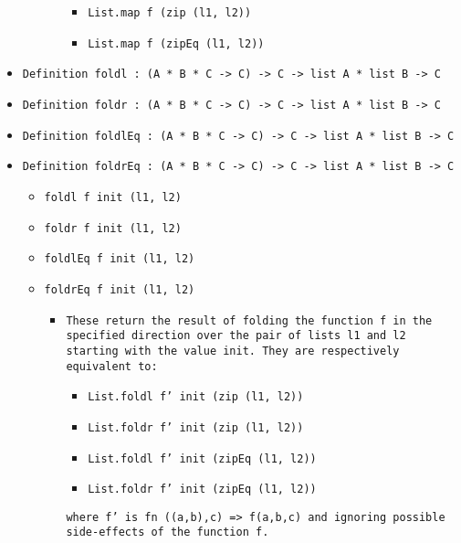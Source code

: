 \documentclass[11pt]{report}
\begin{document}
\begin{itemize}
\begin{itemize}
\begin{itemize}
\begin{itemize}
\item  \texttt{List.map f (zip (l1, l2))}
\item  \texttt{List.map f (zipEq (l1, l2))}
\end{itemize}

\end{itemize}

\end{itemize}

\item  \texttt{Definition foldl : (A * B * C -> C) -> C -> list A * list B -> C}

\item  \texttt{Definition foldr : (A * B * C -> C) -> C -> list A * list B -> C}

\item  \texttt{Definition foldlEq : (A * B * C -> C) -> C -> list A * list B -> C}

\item  \texttt{Definition foldrEq : (A * B * C -> C) -> C -> list A * list B -> C}

\begin{itemize}
\item \texttt{foldl f init (l1, l2)} 
\item \texttt{foldr f init (l1, l2)} 
\item \texttt{foldlEq f init (l1, l2)} 
\item \texttt{foldrEq f init (l1, l2)} 

\begin{itemize} 
\item  \begin{flushleft} \texttt{These return the result of folding the function f in the specified direction over the pair of lists l1 and l2 starting with the value init. They are respectively equivalent to:} \end{flushleft}

\begin{itemize}
\item  \texttt{List.foldl f' init (zip (l1, l2))}
\item  \texttt{List.foldr f' init (zip (l1, l2))}
\item  \texttt{List.foldl f' init (zipEq (l1, l2))}
\item  \texttt{List.foldr f' init (zipEq (l1, l2))}
\end{itemize}
\texttt{where f' is fn ((a,b),c) => f(a,b,c) and ignoring possible side-effects of the function f.}


\end{itemize}
\end{itemize}
\end{itemize}
\end{document}
